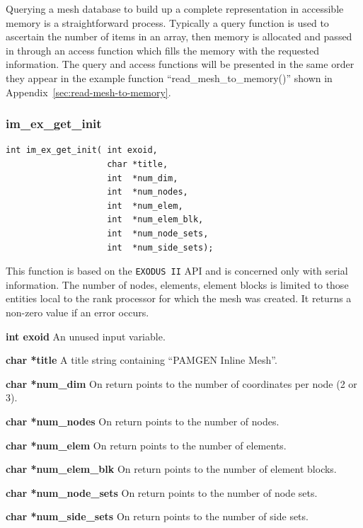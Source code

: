 Querying a mesh database to build up a complete representation in accessible memory is a straightforward process.  Typically a query function is used to ascertain the number of items in an array, then memory is allocated and passed in through an access function which fills the memory with the requested information. The query and access functions will be presented in the same order they appear in the example function ``read\_mesh\_to\_memory()'' shown in Appendix~\ref{sec:read-mesh-to-memory}.


\subsubsection{im\_ex\_get\_init}
{\ttfamily  \begin{verbatim}
int im_ex_get_init( int exoid,
                    char *title,
                    int  *num_dim,
                    int  *num_nodes,
                    int  *num_elem, 
                    int  *num_elem_blk,
                    int  *num_node_sets,
                    int  *num_side_sets);
\end{verbatim}}
This function is based on the \texttt{EXODUS II} API and is concerned only with serial information. The number of nodes, elements, element blocks is limited to those entities local to the rank processor for which the mesh was created. It returns a non-zero value if an error occurs.

{\setlength{\parindent}{0pt}
 \textbf{int exoid} An unused input variable.\par
 \textbf{char *title} A title string containing ``PAMGEN Inline Mesh''.\par
 \textbf{char *num\_dim} On return points to the number of coordinates per node (2 or 3).\par
 \textbf{char *num\_nodes} On return points to the number of nodes.\par
 \textbf{char *num\_elem} On return points to the number of elements.\par
 \textbf{char *num\_elem\_blk} On return points to the number of element blocks.\par
 \textbf{char *num\_node\_sets} On return points to the number of node sets.\par
 \textbf{char *num\_side\_sets} On return points to the number of side sets.\par
}

